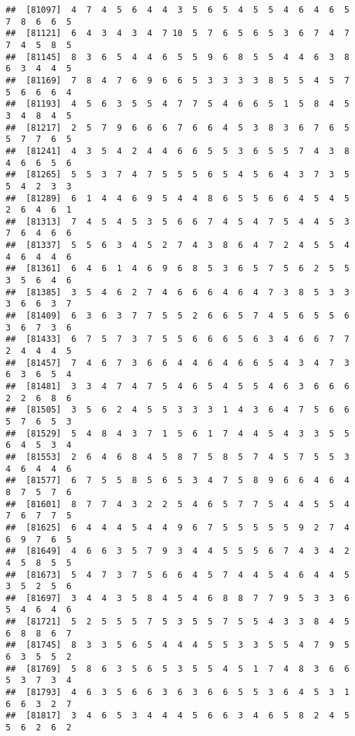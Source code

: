 \documentclass[
]{book}
\begin{document}
\begin{verbatim}
##  [81097]  4  7  4  5  6  4  4  3  5  6  5  4  5  5  4  6  4  6  5  7  8  6  6  5
##  [81121]  6  4  3  4  3  4  7 10  5  7  6  5  6  5  3  6  7  4  7  7  4  5  8  5
##  [81145]  8  3  6  5  4  4  6  5  5  9  6  8  5  5  4  4  6  3  8  6  3  4  4  5
##  [81169]  7  8  4  7  6  9  6  6  5  3  3  3  3  8  5  5  4  5  7  5  6  6  6  4
##  [81193]  4  5  6  3  5  5  4  7  7  5  4  6  6  5  1  5  8  4  5  3  4  8  4  5
##  [81217]  2  5  7  9  6  6  6  7  6  6  4  5  3  8  3  6  7  6  5  5  7  7  6  5
##  [81241]  4  3  5  4  2  4  4  6  6  5  5  3  6  5  5  7  4  3  8  4  6  6  5  6
##  [81265]  5  5  3  7  4  7  5  5  5  6  5  4  5  6  4  3  7  3  5  5  4  2  3  3
##  [81289]  6  1  4  4  6  9  5  4  4  8  6  5  5  6  6  4  5  4  5  2  6  4  6  1
##  [81313]  7  4  5  4  5  3  5  6  6  7  4  5  4  7  5  4  4  5  3  7  6  4  6  6
##  [81337]  5  5  6  3  4  5  2  7  4  3  8  6  4  7  2  4  5  5  4  4  6  4  4  6
##  [81361]  6  4  6  1  4  6  9  6  8  5  3  6  5  7  5  6  2  5  5  3  5  6  4  6
##  [81385]  3  5  4  6  2  7  4  6  6  6  4  6  4  7  3  8  5  3  3  3  6  6  3  7
##  [81409]  6  3  6  3  7  7  5  5  2  6  6  5  7  4  5  6  5  5  6  3  6  7  3  6
##  [81433]  6  7  5  7  3  7  5  5  6  6  6  5  6  3  4  6  6  7  7  2  4  4  4  5
##  [81457]  7  4  6  7  3  6  6  4  4  6  4  6  6  5  4  3  4  7  3  6  3  6  5  4
##  [81481]  3  3  4  7  4  7  5  4  6  5  4  5  5  4  6  3  6  6  6  2  2  6  8  6
##  [81505]  3  5  6  2  4  5  5  3  3  3  1  4  3  6  4  7  5  6  6  5  7  6  5  3
##  [81529]  5  4  8  4  3  7  1  5  6  1  7  4  4  5  4  3  3  5  5  6  4  5  3  4
##  [81553]  2  6  4  6  8  4  5  8  7  5  8  5  7  4  5  7  5  5  3  4  6  4  4  6
##  [81577]  6  7  5  5  8  5  6  5  3  4  7  5  8  9  6  6  4  6  4  8  7  5  7  6
##  [81601]  8  7  7  4  3  2  2  5  4  6  5  7  7  5  4  4  5  5  4  7  6  7  7  5
##  [81625]  6  4  4  4  5  4  4  9  6  7  5  5  5  5  5  9  2  7  4  6  9  7  6  5
##  [81649]  4  6  6  3  5  7  9  3  4  4  5  5  5  6  7  4  3  4  2  4  5  8  5  5
##  [81673]  5  4  7  3  7  5  6  6  4  5  7  4  4  5  4  6  4  4  5  3  5  2  5  6
##  [81697]  3  4  4  3  5  8  4  5  4  6  8  8  7  7  9  5  3  3  6  5  4  6  4  6
##  [81721]  5  2  5  5  5  7  5  3  5  5  7  5  5  4  3  3  8  4  5  6  8  8  6  7
##  [81745]  8  3  3  5  6  5  4  4  4  5  5  3  3  5  5  4  7  9  5  6  3  5  5  2
##  [81769]  5  8  6  3  5  6  5  3  5  5  4  5  1  7  4  8  3  6  6  5  3  7  3  4
##  [81793]  4  6  3  5  6  6  3  6  3  6  6  5  5  3  6  4  5  3  1  6  6  3  2  7
##  [81817]  3  4  6  5  3  4  4  4  5  6  6  3  4  6  5  8  2  4  5  5  6  2  6  2

\end{verbatim}
\end{document}
